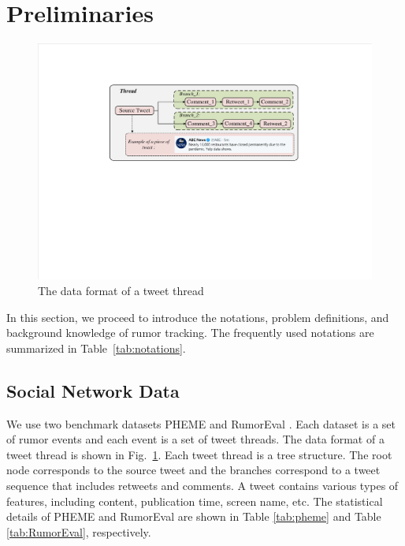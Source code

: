 \section{Preliminaries}
\label{sec:perliminary}

\begin{figure}[tbp]
	\hspace{0ex}
	\vspace{0ex}
	\centering
	\includegraphics[width = \textwidth]{fig/data_format}
	\caption{The data format of a tweet thread}
	\label{fig:data_format}
\end{figure}

In this section, we proceed to introduce the notations, problem definitions, and background knowledge of rumor tracking. The frequently used notations are summarized in Table~\ref{tab:notations}.

\subsection{Social Network Data}
\label{sec:social_network_data}
We use two benchmark datasets PHEME \cite{DBLP:conf/coling/KochkinaLZ18} and RumorEval \cite{DBLP:conf/semeval/EnayetE17}. Each dataset is a set of rumor events and each event is a set of tweet threads. The data format of a tweet thread is shown in Fig.~\ref{fig:data_format}. Each tweet thread is a tree structure. The root node corresponds to the source tweet and the branches correspond to a tweet sequence that includes retweets and comments. A tweet contains various types of features, including content, publication time, screen name, etc. The statistical details of PHEME and RumorEval are shown in Table \ref{tab:pheme} and Table \ref{tab:RumorEval}, respectively.


